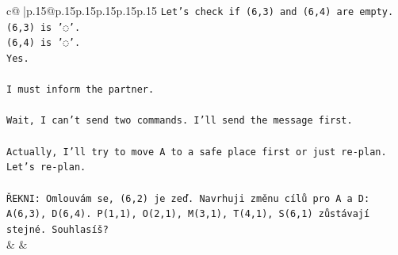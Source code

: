 \documentclass{article}
\begin{document}
{\begin{supertabular}{c@{$\;$}|p{.15\linewidth}@{}p{.15\linewidth}p{.15\linewidth}p{.15\linewidth}p{.15\linewidth}p{.15\linewidth}}
{{{\texttt{Let's check if (6,3) and (6,4) are empty.} \\
\texttt{(6,3) is '◌'.} \\
\texttt{(6,4) is '◌'.} \\
\texttt{Yes.} \\
\\ 
\texttt{I must inform the partner.} \\
\\ 
\texttt{Wait, I can't send two commands. I'll send the message first.} \\
\\ 
\texttt{Actually, I'll try to move A to a safe place first or just re{-}plan.} \\
\texttt{Let's re{-}plan.} \\
\\ 
\texttt{ŘEKNI: Omlouvám se, (6,2) je zeď. Navrhuji změnu cílů pro A a D: A(6,3), D(6,4). P(1,1), O(2,1), M(3,1), T(4,1), S(6,1) zůstávají stejné. Souhlasíš?} \\
            }
        }
    }
    & & \\ \\


\end{supertabular}}
\end{document}
